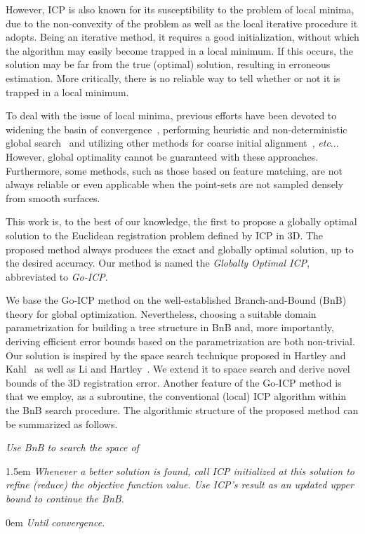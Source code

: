 \documentclass[10pt,journal,cspaper,compsoc]{IEEEtran}
\makeatletter
\DeclareRobustCommand\onedot{\futurelet\@let@token\@onedot}
\def\@onedot{\ifx\@let@token.\else.\null\fi\xspace}
\def\etc{\emph{etc}\onedot} \def\vs{\emph{vs}\onedot}
\makeatother
\begin{document}
However, ICP is also known for its susceptibility to the problem of local minima, due to the non-convexity of the problem as well as the local iterative procedure it adopts.  Being an iterative method, it requires a good initialization, without which the algorithm may easily become trapped in a local minimum.  If this occurs, the solution may be far from the true (optimal) solution, resulting in erroneous estimation.  More critically, there is no reliable way to tell whether or not it is trapped in a local minimum.

To deal with the issue of local minima, previous efforts have been devoted to widening the basin of convergence~\cite{fitzgibbon2003robust,tsin2004correlation}, performing heuristic and non-deterministic global search~\cite{sandhu2010point,silva2005precision} and utilizing other methods for coarse initial alignment~\cite{rusu2009fast,makadia2006fully}, \etc. However, global optimality cannot be guaranteed with these approaches. Furthermore, some methods, such as those based on feature matching, are not always reliable or even applicable when the point-sets are not sampled densely from smooth surfaces.

This work is, to the best of our knowledge, the first to propose a globally optimal solution to the Euclidean registration problem defined by ICP in 3D. The proposed method always produces the exact and globally optimal solution, up to the desired accuracy. Our method is named the \emph{Globally Optimal ICP}, abbreviated to \emph{Go\nobreakdash-ICP}.

We base the Go-ICP method on the well-established Branch-and-Bound (BnB) theory for global optimization. Nevertheless, choosing a suitable domain parametrization for building a tree structure in BnB and, more importantly, deriving efficient error bounds based on the parametrization are both non-trivial. Our solution is inspired by the  space search technique proposed in Hartley and Kahl~\cite{hartley2007global} as well as Li and Hartley~\cite{li20073d}. We extend it to  space search and derive novel bounds of the 3D registration error. Another feature of the Go-ICP method is that we employ, as a subroutine, the  conventional (local) ICP algorithm within the BnB search procedure.
The algorithmic structure of the proposed method can be summarized as follows.
\vspace{0pt}
\begin{framed}
\vspace{-0pt}
\noindent \emph{Use BnB to search the space of }

\hangindent 1.5em
\noindent \emph{Whenever a better solution is found, call ICP initialized at this solution to refine (reduce) the objective function value.  Use ICP's result as an updated upper bound to continue the BnB.}

\hangindent 0em
\noindent \emph{Until convergence.}
\vspace{-0pt}
\end{framed}
\vspace{0pt}
\end{document}
